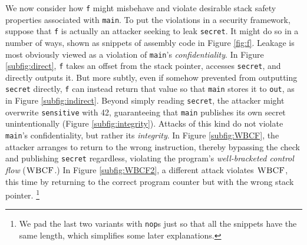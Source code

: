 \documentclass[10pt,conference]{ieeetran}%
\theoremstyle{definition}
\begin{document}

We now consider how {\tt f} might misbehave and violate desirable
stack safety properties associated with {\tt main}. To put the violations in a
security framework, suppose that {\tt f} is actually an attacker seeking
to leak {\tt secret}. It might do so in a number of ways, shown as snippets of
assembly code in Figure \ref{fig:f}.
%
Leakage is most obviously viewed as a violation of {\tt main}'s {\it confidentiality}.
In Figure \ref{subfig:direct}, {\tt f} takes an offset from the stack
pointer, accesses {\tt secret}, and directly outputs it. But more
subtly, even if somehow prevented from outputting {\tt secret} directly, {\tt f}
can instead return that value so that {\tt main} stores it to {\tt out},
as in Figure \ref{subfig:indirect}.
%
Beyond simply reading {\tt secret}, the attacker might overwrite {\tt sensitive}
with 42, guaranteeing that {\tt main} publishes its own secret unintentionally
(Figure \ref{subfig:integrity}).
Attacks of this kind do not violate {\tt main}'s confidentiality, but
rather its {\it integrity}.
In Figure \ref{subfig:WBCF}, the attacker arranges to return to the
wrong instruction, thereby bypassing the check and publishing {\tt secret} regardless,
violating the program's {\it well-bracketed control flow} (\(\textnormal{\sc WBCF}\).)
%
In Figure \ref{subfig:WBCF2}, a different attack violates \(\textnormal{\sc WBCF}\), this time
by returning to the correct program counter but with the wrong stack pointer.
\footnote{We pad the last two variants with {\tt nop}s just so that all the
snippets have the same length, which simplifies some later explanations.}
\end{document}
